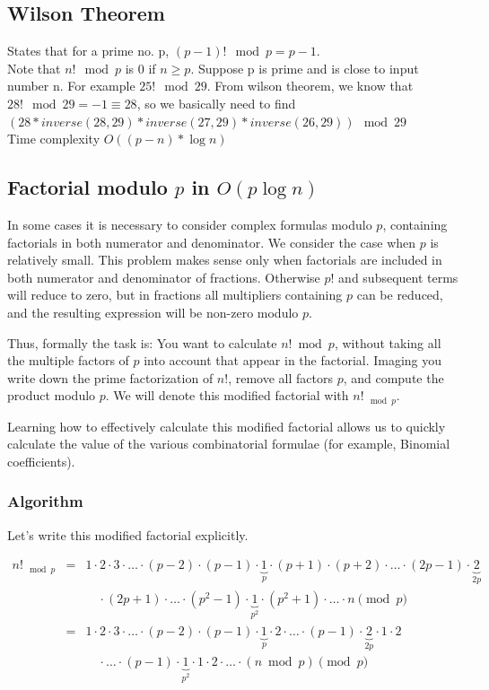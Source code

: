 \documentclass[8pt, a4paper, oneside, twocolumn]{extarticle}
\begin{document}
\subsection{Wilson Theorem}
States that for a prime no. p, $(p - 1)! \mod p = p - 1$.
\\Note that $n! \mod p$ is 0 if $n \geq p$. Suppose p is prime and is close to input number n. For example $25! \mod 29$. From wilson theorem, we know that $28! \mod 29 = -1 \equiv 28$, so we basically need to find $(28 * inverse(28, 29) * inverse (27, 29) * inverse (26, 29)) \mod 29$
\\Time complexity $O((p - n) * \log n)$
\subsection{Factorial modulo $p$ in $O(p \log n)$}
In some cases it is necessary to consider complex formulas modulo $p$, containing factorials in both numerator and denominator. We consider the case when $p$ is relatively small. This problem makes sense only when factorials are included in both numerator and denominator of fractions. Otherwise $p!$ and subsequent terms will reduce to zero, but in fractions all multipliers containing $p$ can be reduced, and the resulting expression will be non-zero modulo $p$.

Thus, formally the task is: You want to calculate $n! \bmod p$, without taking all the multiple factors of $p$ into account that appear in the factorial. Imaging you write down the prime factorization of $n!$, remove all factors $p$, and compute the product modulo $p$. We will denote this modified factorial with $n!_{\mod p}$.

Learning how to effectively calculate this modified factorial allows us to quickly calculate the value of the various combinatorial formulae (for example, Binomial coefficients).

\subsubsection{Algorithm}
Let's write this modified factorial explicitly.

\begin{eqnarray} n!_{\mod p} &=& 1 \cdot 2 \cdot 3 \cdot \ldots \cdot (p-2) \cdot (p-1) \cdot \underbrace{1}_{p} \cdot (p+1) \cdot (p+2) \cdot \ldots \cdot (2p-1) \cdot \underbrace{2}_{2p} \\
& &\quad \cdot (2p+1) \cdot \ldots \cdot (p^2-1) \cdot \underbrace{1}_{p^2} \cdot (p^2 +1) \cdot \ldots \cdot n \pmod{p} \\ &=& 1 \cdot 2 \cdot 3 \cdot \ldots \cdot (p-2) \cdot (p-1) \cdot \underbrace{1}_{p} \cdot 2 \cdot \ldots \cdot (p-1) \cdot \underbrace{2}_{2p} \cdot 1 \cdot 2 \\
& &\quad \cdot \ldots \cdot (p-1) \cdot \underbrace{1}_{p^2} \cdot 1 \cdot 2 \cdot \ldots \cdot (n \bmod p) \pmod{p} \end{eqnarray}
\end{document}
